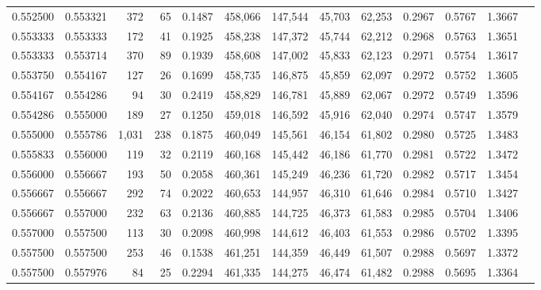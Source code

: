 \begin{tabular}{rrrrrrrrrrrrr}
0.552500 & 0.553321 &   372 &  65 &                                     0.1487 & 458,066 & 147,544 &  45,703 &  62,253 & 0.2967 & 0.5767 & 1.3667 \\
0.553333 & 0.553333 &   172 &  41 &                                     0.1925 & 458,238 & 147,372 &  45,744 &  62,212 & 0.2968 & 0.5763 & 1.3651 \\
0.553333 & 0.553714 &   370 &  89 &                                     0.1939 & 458,608 & 147,002 &  45,833 &  62,123 & 0.2971 & 0.5754 & 1.3617 \\
0.553750 & 0.554167 &   127 &  26 &                                     0.1699 & 458,735 & 146,875 &  45,859 &  62,097 & 0.2972 & 0.5752 & 1.3605 \\
0.554167 & 0.554286 &    94 &  30 &                                     0.2419 & 458,829 & 146,781 &  45,889 &  62,067 & 0.2972 & 0.5749 & 1.3596 \\
0.554286 & 0.555000 &   189 &  27 &                                     0.1250 & 459,018 & 146,592 &  45,916 &  62,040 & 0.2974 & 0.5747 & 1.3579 \\
0.555000 & 0.555786 & 1,031 & 238 &                                     0.1875 & 460,049 & 145,561 &  46,154 &  61,802 & 0.2980 & 0.5725 & 1.3483 \\
0.555833 & 0.556000 &   119 &  32 &                                     0.2119 & 460,168 & 145,442 &  46,186 &  61,770 & 0.2981 & 0.5722 & 1.3472 \\
0.556000 & 0.556667 &   193 &  50 &                                     0.2058 & 460,361 & 145,249 &  46,236 &  61,720 & 0.2982 & 0.5717 & 1.3454 \\
0.556667 & 0.556667 &   292 &  74 &                                     0.2022 & 460,653 & 144,957 &  46,310 &  61,646 & 0.2984 & 0.5710 & 1.3427 \\
0.556667 & 0.557000 &   232 &  63 &                                     0.2136 & 460,885 & 144,725 &  46,373 &  61,583 & 0.2985 & 0.5704 & 1.3406 \\
0.557000 & 0.557500 &   113 &  30 &                                     0.2098 & 460,998 & 144,612 &  46,403 &  61,553 & 0.2986 & 0.5702 & 1.3395 \\
0.557500 & 0.557500 &   253 &  46 &                                     0.1538 & 461,251 & 144,359 &  46,449 &  61,507 & 0.2988 & 0.5697 & 1.3372 \\
0.557500 & 0.557976 &    84 &  25 &                                     0.2294 & 461,335 & 144,275 &  46,474 &  61,482 & 0.2988 & 0.5695 & 1.3364 \\

\end{tabular}

